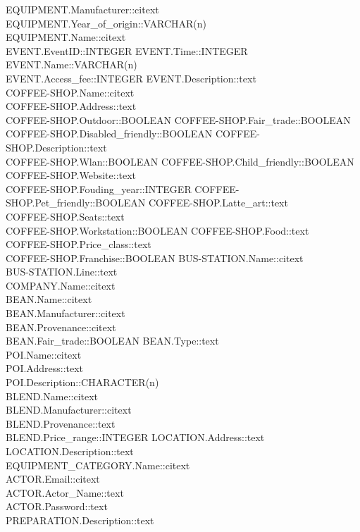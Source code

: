 EQUIPMENT.Manufacturer::citext\\
EQUIPMENT.Year\_of\_origin::VARCHAR(n)\\
EQUIPMENT.Name::citext\\
EVENT.EventID::INTEGER
EVENT.Time::INTEGER
EVENT.Name::VARCHAR(n)\\
EVENT.Access\_fee::INTEGER
EVENT.Description::text\\
COFFEE-SHOP.Name::citext\\
COFFEE-SHOP.Address::text\\
COFFEE-SHOP.Outdoor::BOOLEAN
COFFEE-SHOP.Fair\_trade::BOOLEAN
COFFEE-SHOP.Disabled\_friendly::BOOLEAN
COFFEE-SHOP.Description::text\\
COFFEE-SHOP.Wlan::BOOLEAN
COFFEE-SHOP.Child\_friendly::BOOLEAN
COFFEE-SHOP.Website::text\\
COFFEE-SHOP.Fouding\_year::INTEGER
COFFEE-SHOP.Pet\_friendly::BOOLEAN
COFFEE-SHOP.Latte\_art::text\\
COFFEE-SHOP.Seats::text\\
COFFEE-SHOP.Workstation::BOOLEAN
COFFEE-SHOP.Food::text\\
COFFEE-SHOP.Price\_class::text\\
COFFEE-SHOP.Franchise::BOOLEAN
BUS-STATION.Name::citext\\
BUS-STATION.Line::text\\
COMPANY.Name::citext\\
BEAN.Name::citext\\
BEAN.Manufacturer::citext\\
BEAN.Provenance::citext\\
BEAN.Fair\_trade::BOOLEAN
BEAN.Type::text\\
POI.Name::citext\\
POI.Address::text\\
POI.Description::CHARACTER(n)\\
BLEND.Name::citext\\
BLEND.Manufacturer::citext\\
BLEND.Provenance::text\\
BLEND.Price\_range::INTEGER
LOCATION.Address::text\\
LOCATION.Description::text\\
EQUIPMENT\_CATEGORY.Name::citext\\
ACTOR.Email::citext\\
ACTOR.Actor\_Name::text\\
ACTOR.Password::text\\
PREPARATION.Description::text\\
